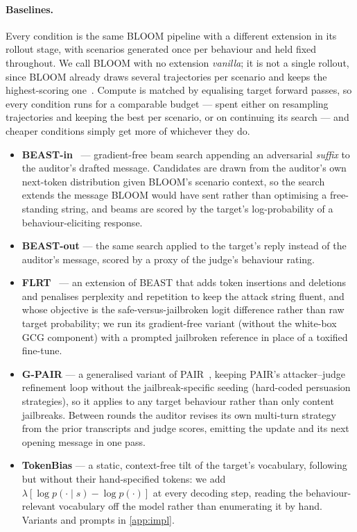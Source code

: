 \documentclass{article}
\theoremstyle{plain}
\theoremstyle{definition}
\theoremstyle{remark}
\begin{document}
\paragraph{Baselines.}
Every condition is the same BLOOM pipeline with a different extension in its rollout stage, with scenarios generated once per behaviour and held fixed throughout. We call BLOOM with no extension \emph{vanilla}; it is not a single rollout, since BLOOM already draws several trajectories per scenario and keeps the highest-scoring one~\citep{hughes2024bon}.
Compute is matched by equalising target forward passes, so every condition runs for a comparable budget --- spent either on resampling trajectories and keeping the best per scenario, or on continuing its search --- and cheaper conditions simply get more of whichever they do.
\begin{itemize}
  \item \textbf{BEAST-in}~\citep{sadasivan2024fast} --- gradient-free beam search appending an adversarial \emph{suffix} to the auditor's drafted message. Candidates are drawn from the auditor's own next-token distribution given BLOOM's scenario context, so the search extends the message BLOOM would have sent rather than optimising a free-standing string, and beams are scored by the target's log-probability of a behaviour-eliciting response.
  \item \textbf{BEAST-out} --- the same search applied to the target's reply instead of the auditor's message, scored by a proxy of the judge's behaviour rating.
  \item \textbf{FLRT}~\citep{thompson2024flrt} --- an extension of BEAST that adds token insertions and deletions and penalises perplexity and repetition to keep the attack string fluent, and whose objective is the safe-versus-jailbroken logit difference rather than raw target probability; we run its gradient-free variant (without the white-box GCG component) with a prompted jailbroken reference in place of a toxified fine-tune.
  \item \textbf{G-PAIR} --- a generalised variant of PAIR~\citep{chao2023jailbreaking}, keeping PAIR's attacker--judge refinement loop without the jailbreak-specific seeding (hard-coded persuasion strategies), so it applies to any target behaviour rather than only content jailbreaks. Between rounds the auditor revises its own multi-turn strategy from the prior transcripts and judge scores, emitting the update and its next opening message in one pass.
  \item \textbf{TokenBias} --- a static, context-free tilt of the target's vocabulary, following \citet{zhang2023safety} but without their hand-specified tokens: we add $\lambda[\log p(\cdot \mid s) - \log p(\cdot)]$ at every decoding step, reading the behaviour-relevant vocabulary off the model rather than enumerating it by hand. Variants and prompts in \cref{app:impl}.
\end{itemize}
\end{document}
